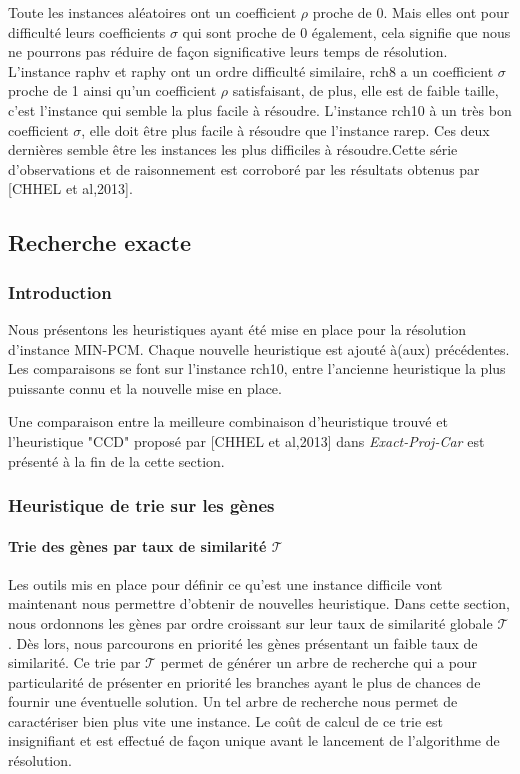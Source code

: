 Toute les instances aléatoires ont un coefficient $\rho$ proche de 0. Mais elles ont pour difficulté leurs coefficients $\sigma$ qui sont proche de 0 également, cela signifie que nous ne pourrons pas réduire de façon significative leurs temps de résolution. L'instance raphv et raphy ont un ordre difficulté similaire, rch8 a un coefficient $\sigma$ proche de 1 ainsi qu'un coefficient $\rho$ satisfaisant, de plus, elle est de faible taille, c'est l'instance qui semble la plus facile à résoudre. L'instance rch10 à un très bon coefficient $\sigma$, elle doit être plus facile à résoudre que l'instance rarep. Ces deux dernières semble être les instances les plus difficiles à résoudre.Cette série d'observations et de raisonnement est corroboré par les résultats obtenus par [CHHEL et al,2013].

\subsection{Recherche exacte}
\subsubsection{Introduction}
Nous présentons les heuristiques ayant été mise en place pour la résolution d'instance MIN-PCM. Chaque nouvelle heuristique est ajouté à(aux) précédentes. Les comparaisons se font sur l'instance rch10, entre l'ancienne heuristique la plus puissante connu et la nouvelle mise en place. 

Une comparaison entre la meilleure combinaison d'heuristique trouvé et l'heuristique "CCD" proposé par [CHHEL et al,2013] dans \textit{Exact-Proj-Car} est présenté à la fin de la cette section.

\subsubsection{Heuristique de trie sur les gènes }
\paragraph{Trie des gènes par taux de similarité $\mathcal{T}$}
Les outils mis en place pour définir ce qu'est une instance difficile vont maintenant nous permettre d'obtenir de nouvelles heuristique. Dans cette section, nous ordonnons les gènes par ordre croissant sur leur taux de similarité globale $\mathcal{T}$. Dès lors, nous parcourons en priorité les gènes présentant un faible taux de similarité. Ce trie par $\mathcal{T}$ permet de générer un arbre de recherche qui a pour particularité de présenter en priorité les branches ayant le plus de chances de fournir une éventuelle solution. Un tel arbre de recherche nous permet de caractériser bien plus vite une instance. Le coût de calcul de ce trie est insignifiant et est effectué de façon unique avant le lancement de l'algorithme de résolution.

